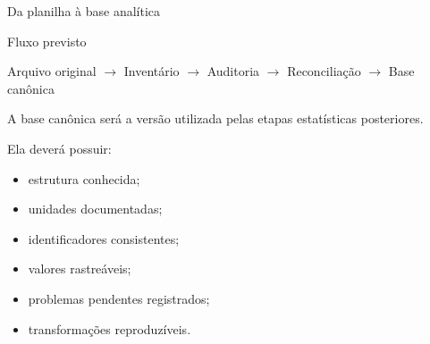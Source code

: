 \begin{frame}{Da planilha à base analítica}

    \begin{block}{Fluxo previsto}
        \centering

        Arquivo original
        $\rightarrow$
        Inventário
        $\rightarrow$
        Auditoria
        $\rightarrow$
        Reconciliação
        $\rightarrow$
        Base canônica
    \end{block}

    \vspace{0.4cm}

    A base canônica será a versão utilizada pelas etapas estatísticas
    posteriores.

    \vspace{0.3cm}

    Ela deverá possuir:

    \begin{itemize}
        \item estrutura conhecida;
        \item unidades documentadas;
        \item identificadores consistentes;
        \item valores rastreáveis;
        \item problemas pendentes registrados;
        \item transformações reproduzíveis.
    \end{itemize}

\end{frame}



